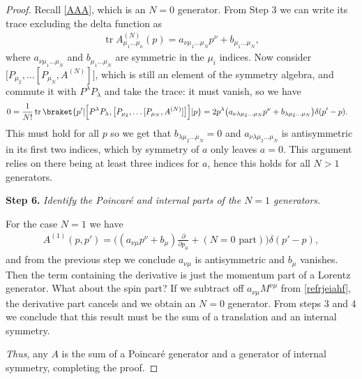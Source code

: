\begin{proof}
Recall \eqref{AAA}, which is an $N =0$ generator. From Step 3 we can write its trace excluding the delta function as \begin{align}
    \operatorname{tr} A^{(N)}_{\mu_1\dots\mu_n}(p) = a_{\nu\mu_1\dots \mu_N} p^\nu + b_{\mu_1\dots\mu_N},
\end{align} where $a_{\nu\mu_1\dots \mu_N}$ and $b_{\mu_1\dots\mu_N}$ are symmetric in the $\mu_i$ indices. Now consider $ \big[P_{\mu_2},\dots [P_{\mu_N},A^{(N)}]\big] $, which is still an element of the symmetry algebra, and commute it with $P^\lambda P_\lambda$ and take the trace: it must vanish, so we have  \begin{align}
    0 &= \frac{1}{N!}\operatorname{tr} \braket{p'|\Big[P^\lambda P_{\lambda},\big[P_{\mu_2},\dots [P_{\mu_N},A^{(N)}]\big]\Big]|p} = 2p^\lambda \big(a_{\nu\lambda\mu_2\dots \mu_N} p^\nu + b_{\lambda\mu_2\dots\mu_N}\big) \delta(p' - p).
\end{align} This must hold for all $p$ so we get that $b_{\lambda\mu_2\dots\mu_N} = 0$ and $a_{\nu\lambda\mu_2\dots \mu_N}$ is antisymmetric in its first two indices, which by symmetry of $a$ only leaves $a = 0$. This argument relies on there being at least three indices for $a$, hence this holds for all $N > 1$ generators. 


\vspace{3pt}
\noindent\textbf{Step 6.} \textit{Identify the Poincar\'e  and internal parts of the  $N = 1$ generators.}
\vspace{2pt}


For the case $N = 1$ we have \begin{align}\label{refrjeiahf}
       A^{(1)} (p,p') = \Big((a_{\nu\mu } p^\nu + b_{\mu }) \frac{\partial}{\partial p_\mu} +  (\text{$N = 0$ part})\Big)\delta(p' - p),
\end{align} and from the previous step we conclude  $a_{\nu\mu}$ is antisymmetric and $b_\mu $ vanishes. Then the term containing the derivative is just the momentum part of a Lorentz generator. What about the spin part? If we subtract off $a_{\nu\mu}M^{\nu\mu}$ from \eqref{refrjeiahf}, the derivative part cancels and we obtain an $N = 0$ generator. From steps 3 and 4 we conclude that this result must be the sum of a translation and an internal symmetry. 

\textit{Thus}, any $A$ is the sum of a Poincar\'e generator and a generator of internal symmetry, completing the proof.
 \end{proof}
